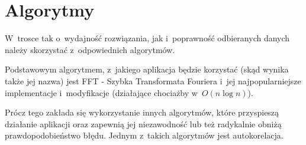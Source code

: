 \documentclass{article}
\begin{document}
\section{Algorytmy}
W~trosce tak o~wydajność rozwiązania, jak i~poprawność odbieranych danych należy
skorzystać z~odpowiednich algorytmów. \par
Podstawowym algorytmem, z~jakiego aplikacja będzie korzystać (skąd wynika także
jej nazwa) jest FFT - Szybka Transformata Fouriera i~jej najpopularniejsze
implementacje i~modyfikacje (działające chociażby w~$O(n\log{}n)$). \par
Prócz tego zakłada się wykorzystanie innych algorytmów, które przyspieszą
działanie aplikacji oraz zapewnią jej niezawodność lub też radykalnie obniżą
prawdopodobieństwo błędu. Jednym z~takich algorytmów jest autokorelacja.
\end{document}
